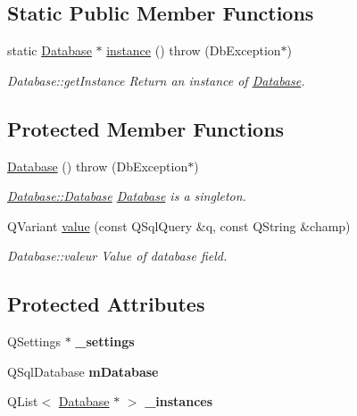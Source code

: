 \subsection*{Static Public Member Functions}
\begin{DoxyCompactItemize}
\item 
static \hyperlink{classDatabase}{Database} $\ast$ \hyperlink{classDatabase_aa334760d1e18f82a344fb696547bfa5c}{instance} ()  throw (\+Db\+Exception$\ast$)
\begin{DoxyCompactList}\small\item\em Database\+::get\+Instance Return an instance of \hyperlink{classDatabase}{Database}. \end{DoxyCompactList}\end{DoxyCompactItemize}
\subsection*{Protected Member Functions}
\begin{DoxyCompactItemize}
\item 
\hypertarget{classDatabase_a4703c80e6969d33565ea340f768fdadf}{\hyperlink{classDatabase_a4703c80e6969d33565ea340f768fdadf}{Database} ()  throw (\+Db\+Exception$\ast$)}\label{classDatabase_a4703c80e6969d33565ea340f768fdadf}

\begin{DoxyCompactList}\small\item\em \hyperlink{classDatabase_a4703c80e6969d33565ea340f768fdadf}{Database\+::\+Database} \hyperlink{classDatabase}{Database} is a singleton. \end{DoxyCompactList}\item 
Q\+Variant \hyperlink{classDatabase_a88f0ccd102fc421fb10ddad0fd94e8c1}{value} (const Q\+Sql\+Query \&q, const Q\+String \&champ)
\begin{DoxyCompactList}\small\item\em Database\+::valeur Value of database field. \end{DoxyCompactList}\end{DoxyCompactItemize}
\subsection*{Protected Attributes}
\begin{DoxyCompactItemize}
\item 
\hypertarget{classDatabase_a6cde413cb6d644c835406c09ec37947e}{Q\+Settings $\ast$ {\bfseries \+\_\+settings}}\label{classDatabase_a6cde413cb6d644c835406c09ec37947e}

\item 
\hypertarget{classDatabase_a64b9dbb3a5e6f42447a24caf726782e1}{Q\+Sql\+Database {\bfseries m\+Database}}\label{classDatabase_a64b9dbb3a5e6f42447a24caf726782e1}

\item 
\hypertarget{classDatabase_a9202583fae82c7f4ecbda6cb11b978c8}{Q\+List$<$ \hyperlink{classDatabase}{Database} $\ast$ $>$ {\bfseries \+\_\+instances}}\label{classDatabase_a9202583fae82c7f4ecbda6cb11b978c8}

\end{DoxyCompactItemize}
